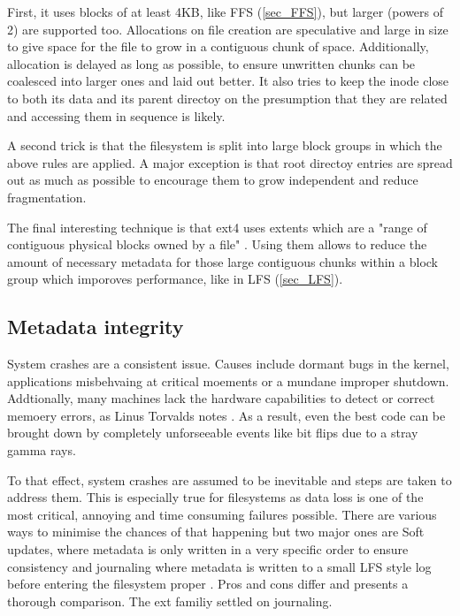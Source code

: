            First, it uses blocks of at least 4KB, like FFS (\ref{sec_FFS}),
            but larger (powers of 2) are supported too. Allocations on file
            creation are speculative and large in size to give space for the
            file to grow in a contiguous chunk of space. Additionally,
            allocation is delayed as long as possible, to ensure unwritten
            chunks can be coalesced into larger ones and laid out better. It
            also tries to keep the inode close to both its data and its parent
            directoy on the presumption that they are related and accessing
            them in sequence is likely.

            A second trick is that the filesystem is split into large block
            groups in which the above rules are applied. A major exception is
            that root directoy entries are spread out as much as possible to
            encourage them to grow independent and reduce fragmentation.

            The final interesting technique is that ext4 uses extents which are
            a "range of contiguous physical blocks owned by a file"
            \cite{ext4_space_maps}. Using them allows to reduce the amount of
            necessary metadata for those large contiguous chunks within a block
            group which imporoves performance, like in LFS (\ref{sec_LFS}).

        \subsection{Metadata integrity}

            System crashes are a consistent issue. Causes include dormant bugs
            in the kernel, applications misbehvaing at critical moements or a
            mundane improper shutdown. Addtionally, many machines lack the
            hardware capabilities to detect or correct memoery errors, as Linus
            Torvalds notes \cite{Linus_ECC_rant}. As a result, even the best
            code can be brought down by completely unforseeable events like bit
            flips due to a stray gamma rays.

            To that effect, system crashes are assumed to be inevitable and
            steps are taken to address them. This is especially true for
            filesystems as data loss is one of the most critical, annoying and
            time consuming failures possible. There are various ways to
            minimise the chances of that happening but two major ones are Soft
            updates, where metadata is only written in a very specific order to
            ensure consistency \cite{soft_updates} and journaling where
            metadata is written to a small LFS style log before entering the
            filesystem proper \cite{ext4_docs}. Pros and cons differ and
            \citeauthor{journaling_vs_soft_updates} presents a thorough
            comparison. The ext familiy settled on journaling.

